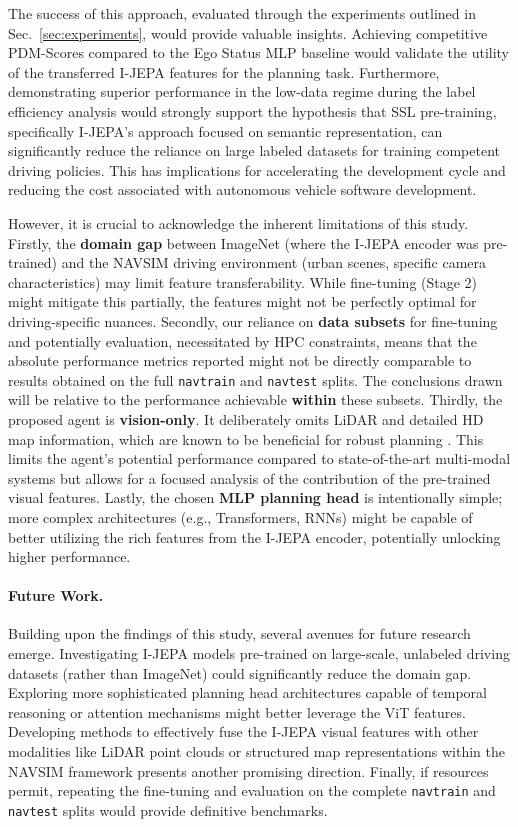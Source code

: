 \documentclass{article}
\begin{document}
The success of this approach, evaluated through the experiments outlined in Sec.~\ref{sec:experiments}, would provide valuable insights. Achieving competitive PDM-Scores compared to the Ego Status MLP baseline would validate the utility of the transferred I-JEPA features for the planning task. Furthermore, demonstrating superior performance in the low-data regime during the label efficiency analysis would strongly support the hypothesis that SSL pre-training, specifically I-JEPA's approach focused on semantic representation, can significantly reduce the reliance on large labeled datasets for training competent driving policies. This has implications for accelerating the development cycle and reducing the cost associated with autonomous vehicle software development.

However, it is crucial to acknowledge the inherent limitations of this study. Firstly, the \textbf{domain gap} between ImageNet (where the I-JEPA encoder was pre-trained) and the NAVSIM driving environment (urban scenes, specific camera characteristics) may limit feature transferability. While fine-tuning (Stage 2) might mitigate this partially, the features might not be perfectly optimal for driving-specific nuances. Secondly, our reliance on \textbf{data subsets} for fine-tuning and potentially evaluation, necessitated by HPC constraints, means that the absolute performance metrics reported might not be directly comparable to results obtained on the full \texttt{navtrain} and \texttt{navtest} splits. The conclusions drawn will be relative to the performance achievable \textbf{within} these subsets. Thirdly, the proposed agent is \textbf{vision-only}. It deliberately omits LiDAR and detailed HD map information, which are known to be beneficial for robust planning \cite{chitta2023transfuser}. This limits the agent's potential performance compared to state-of-the-art multi-modal systems but allows for a focused analysis of the contribution of the pre-trained visual features. Lastly, the chosen \textbf{MLP planning head} is intentionally simple; more complex architectures (e.g., Transformers, RNNs) might be capable of better utilizing the rich features from the I-JEPA encoder, potentially unlocking higher performance.

\paragraph{Future Work.}
Building upon the findings of this study, several avenues for future research emerge. Investigating I-JEPA models pre-trained on large-scale, unlabeled driving datasets (rather than ImageNet) could significantly reduce the domain gap. Exploring more sophisticated planning head architectures capable of temporal reasoning or attention mechanisms might better leverage the ViT features. Developing methods to effectively fuse the I-JEPA visual features with other modalities like LiDAR point clouds or structured map representations within the NAVSIM framework presents another promising direction. Finally, if resources permit, repeating the fine-tuning and evaluation on the complete \texttt{navtrain} and \texttt{navtest} splits would provide definitive benchmarks.
\end{document}
